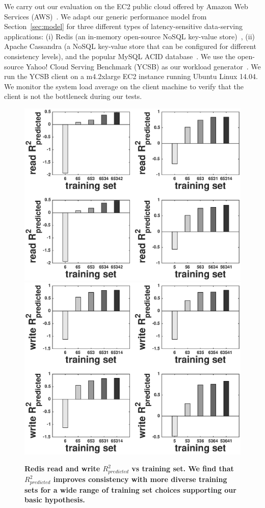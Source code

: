 We carry out our evaluation on the EC2 public cloud offered by Amazon Web Services (AWS)~\cite{amazon-ec2}. We adapt our generic performance model from Section~\ref{sec:model} for three different types of latency-sensitive data-serving applications: (i) Redis (an in-memory open-source NoSQL key-value store)~\cite{redis}, (ii) Apache Cassandra (a NoSQL key-value store that can be configured for different consistency levels), and the popular MySQL ACID database~\cite{mysql}. We use the open-source Yahoo! Cloud Serving Benchmark (YCSB) as our workload generator~\cite{Cooper:2010:BCS:1807128.1807152}. We run the YCSB client on a m4.2xlarge EC2 instance running Ubuntu Linux 14.04. We monitor the system load average on the client machine to verify that the client is not the bottleneck during our tests.


  \begin{figure}
    \centering
    \includegraphics[scale = 0.4]{bar_read_avg_latency.eps}
    \includegraphics[scale = 0.4]{bar_write_avg_latency.eps}
    \caption{\textbf{Redis read and write $R^2_{predicted}$ vs training set.  We find that $R^2_{predicted}$ improves consistency with more diverse training sets for a wide range of training set choices supporting our basic hypothesis.}}
    \label{figure:redisbarreadwrite}
  \end{figure}
